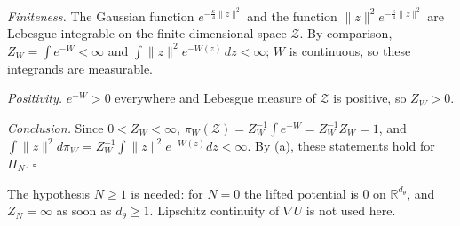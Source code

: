 \documentclass[11pt,a4paper]{report}
\begin{document}
\emph{Finiteness.} The Gaussian function \(e^{-\frac\kappa4\|z\|^2}\) and the function \(\|z\|^2e^{-\frac\kappa4\|z\|^2}\) are Lebesgue integrable on the finite-dimensional space \(\mathcal Z\). By comparison, \(Z_W=\int e^{-W}<\infty\) and \(\int\|z\|^2e^{-W(z)}\,dz<\infty\); \(W\) is continuous, so these integrands are measurable.




\emph{Positivity.} \(e^{-W}>0\) everywhere and Lebesgue measure of \(\mathcal Z\) is positive, so \(Z_W>0\).




\emph{Conclusion.} Since \(0<Z_W<\infty\), \(\pi_W(\mathcal Z)=Z_W^{-1}\int e^{-W}=Z_W^{-1}Z_W=1\), and \(\int\|z\|^2d\pi_W=Z_W^{-1}\int\|z\|^2e^{-W(z)}dz<\infty\). By (a), these statements hold for \(\Pi_N\). \(\square\)




The hypothesis \(N\ge1\) is needed: for \(N=0\) the lifted potential is \(0\) on \(\mathbb R^{d_\theta}\), and \(Z_N=\infty\) as soon as \(d_\theta\ge1\). Lipschitz continuity of \(\nabla U\) is not used here.
\end{document}
